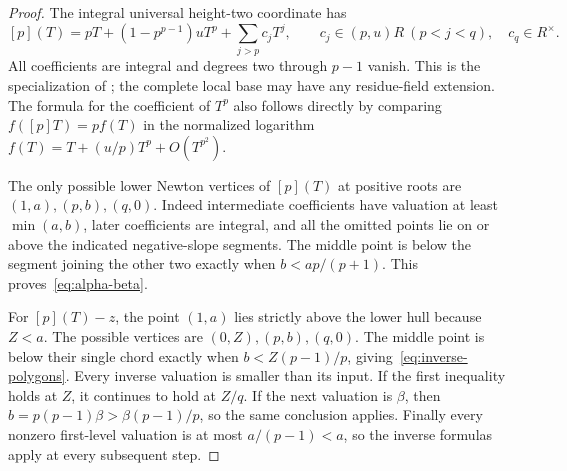 \begin{proof}
The integral universal height-two coordinate has
\[
 [p](T)=pT+(1-p^{p-1})uT^p+\sum_{j>p}c_jT^j,
 \qquad c_j\in(p,u)R\ (p<j<q),\quad c_q\in R^\times.
\]
All coefficients are integral and degrees two through $p-1$ vanish. This is the specialization of \citet[Proposition~5.7, equations~(12.3)--(12.5), and Proposition~12.10]{HopkinsGross1994}; the complete local base may have any residue-field extension. The formula for the coefficient of $T^p$ also follows directly by comparing $f([p]T)=pf(T)$ in the normalized logarithm $f(T)=T+(u/p)T^p+O(T^{p^2})$.

The only possible lower Newton vertices of $[p](T)$ at positive roots are $(1,a),(p,b),(q,0)$. Indeed intermediate coefficients have valuation at least $\min(a,b)$, later coefficients are integral, and all the omitted points lie on or above the indicated negative-slope segments. The middle point is below the segment joining the other two exactly when $b<ap/(p+1)$. This proves~\eqref{eq:alpha-beta}.

For $[p](T)-z$, the point $(1,a)$ lies strictly above the lower hull because $Z<a$. The possible vertices are $(0,Z),(p,b),(q,0)$. The middle point is below their single chord exactly when $b<Z(p-1)/p$, giving~\eqref{eq:inverse-polygons}. Every inverse valuation is smaller than its input. If the first inequality holds at $Z$, it continues to hold at $Z/q$. If the next valuation is $\beta$, then
$b=p(p-1)\beta>\beta(p-1)/p$, so the same conclusion applies. Finally every nonzero first-level valuation is at most $a/(p-1)<a$, so the inverse formulas apply at every subsequent step.
\end{proof}

